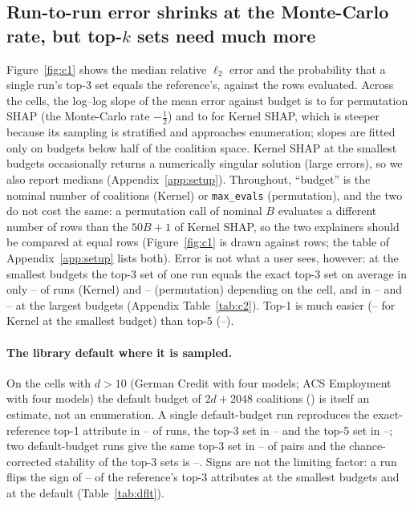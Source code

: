 \subsection{Run-to-run error shrinks at the Monte-Carlo rate, but top-$k$ sets need much more}
Figure~\ref{fig:c1} shows the median relative $\ell_2$ error and the probability that a single run's top-3 set equals the reference's, against the rows evaluated. Across the \numnCells{} cells, the log--log slope of the mean error against budget is \numslopePermLo{} to \numslopePermHi{} for permutation SHAP (the Monte-Carlo rate $-\tfrac12$) and \numslopeKernelLo{} to \numslopeKernelHi{} for Kernel SHAP, which is steeper because its sampling is stratified and approaches enumeration; slopes are fitted only on budgets below half of the coalition space. Kernel SHAP at the smallest budgets occasionally returns a numerically singular solution (large errors), so we also report medians (Appendix~\ref{app:setup}).
Throughout, ``budget'' is the nominal number of coalitions (Kernel) or \texttt{max\_evals} (permutation), and the two do not cost the same: a permutation call of nominal $B$ evaluates a different number of rows than the $50B+1$ of Kernel SHAP, so the two explainers should be compared at equal rows (Figure~\ref{fig:c1} is drawn against rows; the table of Appendix~\ref{app:setup} lists both). Error is not what a user sees, however: at the smallest budgets the top-3 set of one run equals the exact top-3 set on average in only \nummatchSmallKLo{}--\nummatchSmallKHi{} of runs (Kernel) and \nummatchSmallPLo{}--\nummatchSmallPHi{} (permutation) depending on the cell, and in \nummatchLargeKLo{}--\nummatchLargeKHi{} and \nummatchLargePLo{}--\nummatchLargePHi{} at the largest budgets (Appendix Table~\ref{tab:c2}). Top-1 is much easier (\nummatchOneSmallKLo{}--\nummatchOneSmallKHi{} for Kernel at the smallest budget) than top-5 (\nummatchFiveSmallKLo{}--\nummatchFiveSmallKHi{}).
\paragraph{The library default where it is sampled.}
On the \numnDefaultCells{} cells with $d>10$ (German Credit with four models; ACS Employment with four models) the default budget of $2d+2048$ coalitions (\numdfltBudget) is itself an estimate, not an enumeration. A single default-budget run reproduces the exact-reference top-1 attribute in \numdfltMatchOneLo{}--\numdfltMatchOneHi{} of runs, the top-3 set in \numdfltMatchThreeLo{}--\numdfltMatchThreeHi{} and the top-5 set in \numdfltMatchFiveLo{}--\numdfltMatchFiveHi{}; two default-budget runs give the same top-3 set in \numpairDefaultLo{}--\numpairDefaultHi{} of pairs and the chance-corrected stability of the top-3 sets \citep{nogueira2018stability} is \numdfltNogueiraLo{}--\numdfltNogueiraHi{}. Signs are not the limiting factor: a run flips the sign of \numsignflipSmallKLo{}--\numsignflipSmallKHi{} of the reference's top-3 attributes at the smallest budgets and \numdfltSignFlipHi{} at the default (Table~\ref{tab:dflt}).

